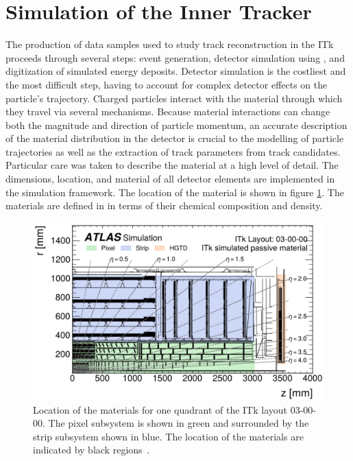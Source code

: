 \section{Simulation of the Inner Tracker}
\label{sect:itk-simulation}
The production of data samples used to study track reconstruction in the ITk proceeds through several steps: event generation, detector simulation using \GEANT \cite{Agostinelli:2002hh}, and digitization of simulated energy deposits. 
Detector simulation is the costliest and the most difficult step, having to account for complex detector effects on the particle's trajectory.
Charged particles interact with the material through which they travel via several mechanisms. 
Because material interactions can change both the magnitude and direction of particle momentum, an accurate description of the material distribution in the detector is crucial to the modelling of particle trajectories as well as the extraction of track parameters from track candidates. 
Particular care was taken to describe the material at a high level of detail. 
The dimensions, location, and material of all detector elements are implemented in the simulation framework. 
The location of the material is shown in figure \ref{fig:itk-material-location}. 
The materials are defined in \GEANT in terms of their chemical composition and density.

\begin{figure}[h!]
    \centering
    \includegraphics[width=0.75\linewidth]{figures/itk-material-location.png}
    \caption{Location of the materials for one quadrant of the ITk layout 03-00-00. The pixel subsystem is shown in green and surrounded by the strip subsystem shown in blue. The location of the materials are indicated by black regions~\cite{2HDMWGproxi}. }
    \label{fig:itk-material-location}
\end{figure}

